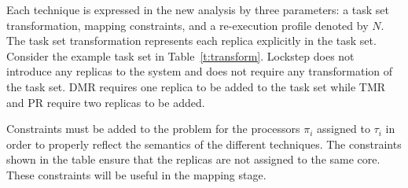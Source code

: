 	
	Each technique is expressed in the new analysis by three parameters: a task set transformation, mapping constraints, and a re-execution profile denoted by $N$.
	The task set transformation represents each replica explicitly in the task set. 
	Consider the example task set in Table~\ref{t:transform}. 
	Lockstep does not introduce any replicas to the system and does not require any transformation of the task set. 
	DMR requires one replica to be added to the task set while TMR and PR require two replicas to be added.
	
	Constraints must be added to the problem for the processors $\pi_i$ assigned to $\tau_i$ in order to properly reflect the semantics of the different techniques. 
	The constraints shown in the table ensure that the replicas are not assigned to the same core. 
	These constraints will be useful in the mapping stage.
	
